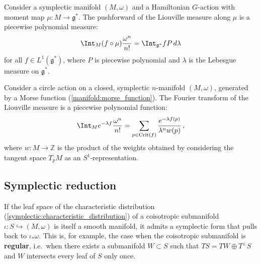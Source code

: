     \begin{theorem}
        Consider a symplectic manifold $(M,\omega)$ and a Hamiltonian $G$-action with moment map $\mu:M\rightarrow\mathfrak{g}^*$. The pushforward of the Liouville measure along $\mu$ is a piecewise polynomial measure:
        \begin{gather}
            \Int_M (f\circ\mu)\frac{\omega^n}{n!} = \Int_{\mathfrak{g}^*}fP\,d\lambda
        \end{gather}
        for all $f\in L^1(\mathfrak{g}^*)$, where $P$ is piecewise polynomial and $\lambda$ is the Lebesgue measure on $\mathfrak{g}^*$.
    \end{theorem}
    \begin{result}[Localization]
        Consider a circle action on a closed, symplectic $n$-manifold $(M,\omega)$, generated by a Morse function (\cref{manifold:morse_function}). The Fourier transform of the Liouville measure is a piecewise polynomial function:
        \begin{gather}
            \Int_Me^{-\lambda f}\frac{\omega^n}{n!} = \sum_{p\in\mathrm{Crit}(f)}\frac{e^{-\lambda f(p)}}{\lambda^nw(p)}\,,
        \end{gather}
        where $w:M\rightarrow\mathbb{Z}$ is the product of the weights obtained by considering the tangent space $T_pM$ as an $S^1$-representation.
    \end{result}


\subsection{Symplectic reduction}

    \begin{property}
        If the leaf space of the characteristic distribution (\cref{symplectic:characteristic_distribution}) of a coisotropic submanifold $\iota:S\hookrightarrow(M,\omega)$ is itself a smooth manifold, it admits a symplectic form that pulls back to $\iota_*\omega$. This is, for example, the case when the coisotropic submanifold is \textbf{regular}, i.e.~when there exists a submanifold $W\subset S$ such that $TS=TW\oplus T^\perp S$ and $W$ intersects every leaf of $S$ only once.
    \end{property}


